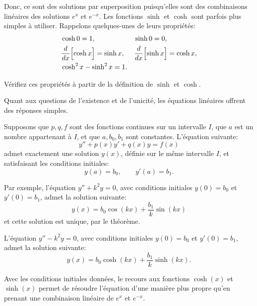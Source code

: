 Donc, ce sont des solutions par superposition puisqu'elles sont des combinaisons linéaires des solutions $e^x$ et $e^{-x}$.   Les fonctions $\sinh$ et $\cosh$ sont parfois plus simples à utiliser.  Rappelons quelques-unes de leurs propriétés:
\begin{align*}
& \cosh 0  = 1 , &   & \sinh 0 = 0 , \\
& \frac{d}{dx} \Bigl[ \cosh x \Bigr] = \sinh x , &  & \frac{d}{dx} \Bigl[ \sinh x \Bigr] = \cosh x , \\
& \cosh^2 x - \sinh^2 x = 1 .
\end{align*}


\begin{exercise}
Vérifiez ces propriétés à partir de la définition de $\sinh$
et $\cosh$.
\end{exercise}

Quant aux questions de l'existence et de l'unicité, les équations linéaires offrent des réponses simples.

\begin{theorem}
Supposons que $p, q, f$ sont des fonctions continues sur un intervalle
$I$, que $a$ est un nombre appartenant à $I$,
et que $a, b_0, b_1$ sont constantes.
L'équation suivante: 
\begin{equation*}
y'' + p(x) y' + q(x) y = f(x) 
\end{equation*}
admet exactement une solution $y(x)$, définie sur le même intervalle $I$, et satisfaisant les conditions initiales: 
\begin{equation*}
y(a) = b_0 , \qquad y'(a) = b_1 .
\end{equation*}
\end{theorem}

Par exemple, l'équation $y'' + k^2 y = 0$, avec conditions initiales $y(0) = b_0$ et $y'(0) = b_1$,
admet la solution suivante: 
\begin{equation*}
y(x) = b_0 \cos (kx) + \frac{b_1}{k} \sin (kx) 
\end{equation*}
et cette solution est unique, par le théorème.

L'équation $y'' - k^2 y = 0$, avec conditions initiales $y(0) = b_0$ et $y'(0) = b_1$,
admet la solution suivante:
\begin{equation*}
y(x) = b_0 \cosh (kx) + \frac{b_1}{k} \sinh (kx) .
\end{equation*}

Avec les conditions initiales données, le recours aux fonctions $\cosh(x)$ et $\sinh(x)$  permet de résoudre l'équation d'une manière plus propre qu'en prenant une combinaison linéaire de $e^x$ et $e^{-x}$.

